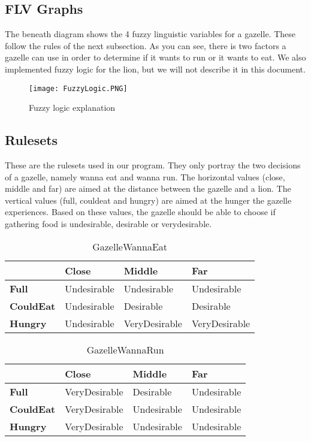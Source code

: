 \subsection{FLV Graphs}\label{subsec:flvGraphs}
The beneath diagram shows the 4 fuzzy linguistic variables for a gazelle.
These follow the rules of the next subsection.
As you can see, there is two factors a gazelle can use in order to determine if it wants to run or it wants to eat.
We also implemented fuzzy logic for the lion, but we will not describe it in this document.
\begin{figure}[ht]
    \begin{center}
        \texttt{[image: FuzzyLogic.PNG]}
    \end{center}
    \caption{Fuzzy logic explanation}
    \label{fig:FuzzyLogicExplanation}
\end{figure}
\subsection{Rulesets}
These are the rulesets used in our program.
They only portray the two decisions of a gazelle, namely wanna eat and wanna run.
The horizontal values (close, middle and far) are aimed at the distance between the gazelle and a lion.
The vertical values (full, couldeat and hungry) are aimed at the hunger the gazelle experiences.
Based on these values, the gazelle should be able to choose if gathering food is undesirable, desirable or verydesirable.
\begin{table}[ht]
    \centering
    \label{EatDesirability}
    \begin{tabular}{|l|l|l|l|}
        \hline
        & \textbf{Close}       & \textbf{Middle}        & \textbf{Far}           \\ \hline
        \textbf{Full}     & Undesirable & Undesirable   & Undesirable   \\ \hline
        \textbf{CouldEat} & Undesirable & Desirable     & Desirable     \\ \hline
        \textbf{Hungry}   & Undesirable & VeryDesirable & VeryDesirable \\ \hline
    \end{tabular}
    \caption{GazelleWannaEat}
\end{table}
\begin{table}[ht]
    \centering
    \label{|RunDesirability}
    \begin{tabular}{|l|l|l|l|}
        \hline
        & \textbf{Close}       & \textbf{Middle}        & \textbf{Far}           \\ \hline
        \textbf{Full}     & VeryDesirable & Desirable       & Undesirable     \\ \hline
        \textbf{CouldEat} & VeryDesirable & Undesirable     & Undesirable \\ \hline
        \textbf{Hungry}   & VeryDesirable & Undesirable     & Undesirable \\ \hline
    \end{tabular}
    \caption{GazelleWannaRun}
\end{table}
